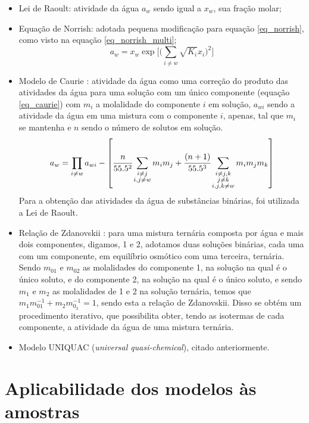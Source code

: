 \documentclass[
	12pt,				%
	openright,
	twoside,
	a4paper,			%
	english,			%
	french,				%
	spanish,			%
	brazil				%
	]{abntex2}
\begin{document}
\begin{itemize}
	\item Lei de Raoult: atividade da água $a_w$ sendo igual a $x_w$,
		sua fração molar;
	\item Equação de Norrish: adotada pequena modificação para equação
		\ref{eq_norrish}, como visto na equação \ref{eq_norrish_multi};
		\begin{equation}
			\label{eq_norrish_multi}
			a_w = x_w\exp\Big[\Big(\sum_{i \neq w}%
			\sqrt{K_i}x_i\Big)^2\Big]
		\end{equation}
	\item Modelo de Caurie \cite{caurie1986}: atividade da água como uma
		correção do produto das atividades da água para uma solução
		com um único componente (equação \ref{eq_caurie}) com
		$m_i$ a molalidade do componente $i$ em solução, $a_{wi}$
		sendo a atividade da água em uma mistura com o componente
		$i$, apenas, tal que $m_i$ se mantenha e $n$ sendo o número de
		solutos em solução.
		\begin{equation}
			\label{eq_caurie}
			a_w = \prod_{i \neq w}a_{wi}-\left[\cfrac{n}%
			{55.5^2}\sum_{\substack{i \neq j \\ i,j \neq w}}%
			m_im_j + \cfrac{(n+1)}{55.5^3}\sum_{%
			\substack{i\neq j,k \\ j \neq k \\  i,j,k \neq w}}%
			m_im_jm_k\right]
		\end{equation}
		Para a obtenção das atividades da água de substâncias
		binárias, foi utilizada a Lei de Raoult.
	\item Relação de Zdanovskii \cite{chen1973,sangster1973}:
		para uma mistura ternária composta por água e mais dois
		componentes, digamos, 1 e 2, adotamos duas soluções binárias,
		cada uma com um componente, em equilíbrio osmótico com uma
		terceira, ternária. Sendo $m_{01}$ e $m_{02}$ as
		molalidades do componente 1, na solução na qual é o único
		soluto, e do componente 2, na solução na qual é o único soluto, e
		sendo $m_1$ e $m_2$ as molalidades de 1 e 2 na solução ternária,
		temos que $m_1m_{01}^{-1} + m_2m_{0_2}^{-1} = 1$, sendo esta a
		relação de Zdanovskii. Disso se obtém um procedimento iterativo,
		que possibilita obter, tendo as isotermas de cada componente, a
		atividade da água de uma mistura ternária.
	\item Modelo UNIQUAC (\textit{universal quasi-chemical}), citado
		anteriormente.
\end{itemize}

\section{Aplicabilidade dos modelos às amostras}
\end{document}
